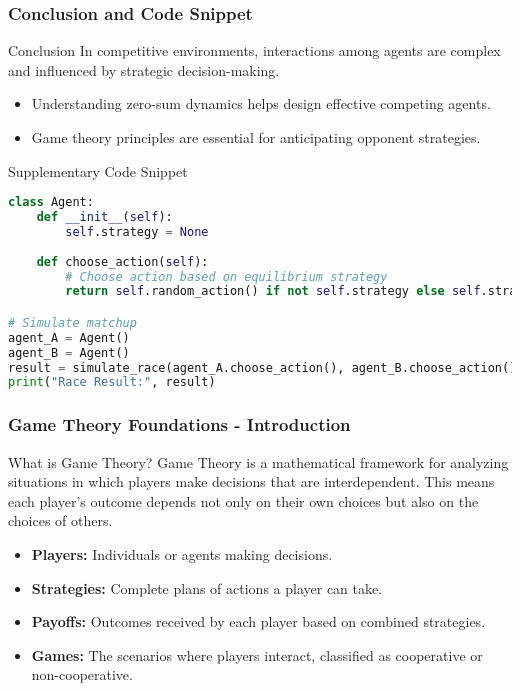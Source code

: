 \documentclass[aspectratio=169]{beamer}
\begin{document}
\begin{frame}[fragile]
    \frametitle{Conclusion and Code Snippet}
    \begin{block}{Conclusion}
        In competitive environments, interactions among agents are complex and influenced by strategic decision-making. 
        \begin{itemize}
            \item Understanding zero-sum dynamics helps design effective competing agents.
            \item Game theory principles are essential for anticipating opponent strategies.
        \end{itemize}
    \end{block}
    
    \begin{block}{Supplementary Code Snippet}
    \begin{lstlisting}[language=Python]
class Agent:
    def __init__(self):
        self.strategy = None
    
    def choose_action(self):
        # Choose action based on equilibrium strategy
        return self.random_action() if not self.strategy else self.strategy

# Simulate matchup
agent_A = Agent()
agent_B = Agent()
result = simulate_race(agent_A.choose_action(), agent_B.choose_action())
print("Race Result:", result)
    \end{lstlisting}
    \end{block}
\end{frame}

\begin{frame}[fragile]
  \frametitle{Game Theory Foundations - Introduction}
  \begin{block}{What is Game Theory?}
    Game Theory is a mathematical framework for analyzing situations in which players make decisions that are interdependent. This means each player’s outcome depends not only on their own choices but also on the choices of others.
  \end{block}

  \begin{itemize}
    \item \textbf{Players:} Individuals or agents making decisions.
    \item \textbf{Strategies:} Complete plans of actions a player can take.
    \item \textbf{Payoffs:} Outcomes received by each player based on combined strategies.
    \item \textbf{Games:} The scenarios where players interact, classified as cooperative or non-cooperative.
  \end{itemize}
\end{frame}
\end{document}

